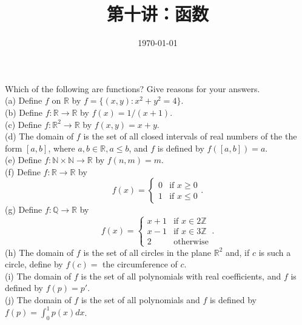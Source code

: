 \documentclass[11pt, a4paper, UTF8]{ctexart}
\title{第十讲：函数}
\date{\today}     %
\begin{document}
\maketitle
\noplagiarism	%
\beginthishw	%

\begin{problem}[UD: 13.3]	%
    Which of the following are functions? Give reasons for your answers.\\
    (a) Define $f$ on $\mathbb{R}$ by $f = \{ (x,y):x^{2} + y^{2} = 4 \}$.\\
    (b) Define $f:\mathbb{R} \rightarrow \mathbb{R}$ by $f(x) = 1/(x+1)$.\\
    (c) Define $f:\mathbb{R}^{2} \rightarrow \mathbb{R}$ by $f(x,y) = x+y$.\\
    (d) The domain of $f$ is the set of all closed intervals of real numbers 
    of the the form $[a,b]$, where $a,b \in \mathbb{R},a \leq b$, and $f$ is defined 
    by $f([a,b]) = a$.\\
    (e) Define $f: \mathbb{N} \times \mathbb{N} \rightarrow \mathbb{R}$ by $f(n,m) = m$.\\
    (f) Define $f: \mathbb{R} \rightarrow \mathbb{R}$ by\\
        $$f(x) = 
          \begin{cases}
            0& \text{if $x \geq 0$}\\
            1& \text{if $x \leq 0$}
          \end{cases}.$$
    (g) Define $f: \mathbb{Q} \rightarrow \mathbb{R}$ by\\
        $$f(x) = 
          \begin{cases}
            x + 1& \text{if $x \in 2\mathbb{Z}$}\\
            x - 1& \text{if $x \in 3\mathbb{Z}$}\\
            2& \text{otherwise}
          \end{cases}.$$
    (h) The domain of $f$ is the set of all circles in the plane $\mathbb{R}^{2}$ and, 
    if $c$ is such a circle, define by $f(c) = $ the circumference of $c$.\\
    (i) The domain of $f$ is the set of all polynomials with real coefficients, and $f$ 
    is defined by $f(p) = p'$.\\
    (j) The domain of $f$ is the set of all polynomials and $f$ is defined by 
    $f(p) = \int_{0}^{1} p(x)dx$.
\end{problem}
\end{document}
